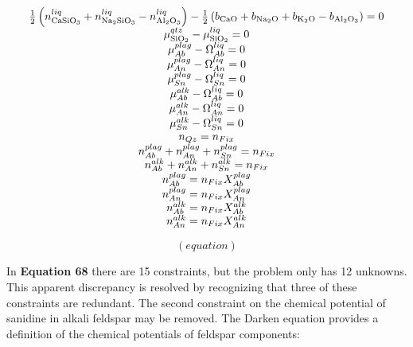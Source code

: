 \documentclass[11pt, titlepage, twoside]{article}
\begin{document}
\begin{MPEquation}[!ht]
\begin{equation}
\begin{array}{c}
\frac{1}{2}\left( {n_{{\rm{CaSi}}{{\rm{O}}_3}}^{liq} + n_{{\rm{N}}{{\rm{a}}_2}{\rm{Si}}{{\rm{O}}_3}}^{liq} - n_{{\rm{A}}{{\rm{l}}_2}{{\rm{O}}_3}}^{liq}} \right) - \frac{1}{2}\left( {{b_{{\rm{CaO}}}} + {b_{{\rm{N}}{{\rm{a}}_2}{\rm{O}}}} + {b_{{{\rm{K}}_2}{\rm{O}}}} - {b_{{\rm{A}}{{\rm{l}}_2}{{\rm{O}}_3}}}} \right) = 0\\
\mu _{{\rm{Si}}{{\rm{O}}_2}}^{qtz} - \mu _{{\rm{Si}}{{\rm{O}}_2}}^{liq} = 0\\
\mu _{Ab}^{plag} - {\Omega _{Ab}^{liq}} = 0\\
\mu _{An}^{plag} - {\Omega _{An}^{liq}} = 0\\
\mu _{Sn}^{plag} - {\Omega _{Sn}^{liq}} = 0\\
\mu _{Ab}^{alk} - {\Omega _{Ab}^{liq}} = 0\\
\mu _{An}^{alk} - {\Omega _{An}^{liq}} = 0\\
\mu _{Sn}^{alk} - {\Omega _{Sn}^{liq}} = 0\\
{n_{Qz}} = {n_{Fix}}\\
n_{Ab}^{plag} + n_{An}^{plag} + n_{Sn}^{plag} = {n_{Fix}}\\
n_{Ab}^{alk} + n_{An}^{alk} + n_{Sn}^{alk} = {n_{Fix}}\\
n_{Ab}^{plag} = {n_{Fix}}X_{Ab}^{plag}\\
n_{An}^{plag} = {n_{Fix}}X_{An}^{plag}\\
n_{Ab}^{alk} = {n_{Fix}}X_{Ab}^{alk}\\
n_{An}^{alk} = {n_{Fix}}X_{An}^{alk}
\end{array}
\end{equation}
\label{MPEquationElement:F3DD925F-F86F-4E98-FE6E-7188D80EAACE}
\end{MPEquation}

\begin{MPEquation}[!ht]
\begin{equation}
(equation)
\end{equation}
\label{MPEquationElement:333B9059-0577-45D0-A2C9-B751545A9002}
\end{MPEquation}
In \textbf{Equation 68} there are 15 constraints, but the problem only has 12 unknowns. This apparent discrepancy is resolved by recognizing that three of these constraints are redundant. The second constraint on the chemical potential of sanidine in alkali feldspar may be removed. The Darken equation provides a definition of the chemical potentials of feldspar components:
\end{document}
